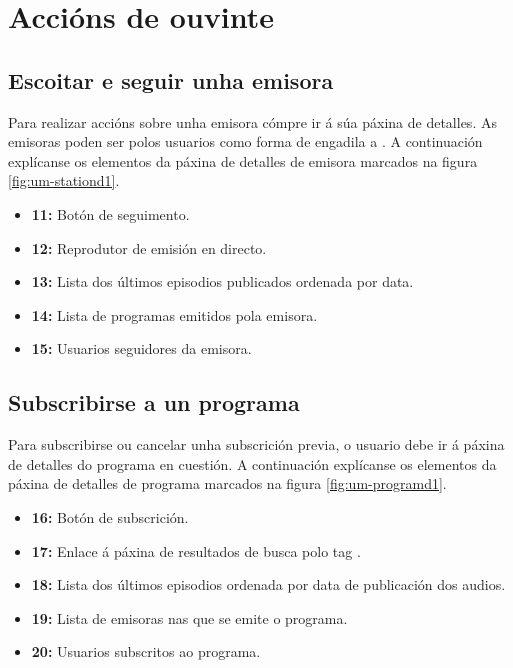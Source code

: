\section{Accións de ouvinte}

\subsection{Escoitar e seguir unha emisora}

Para realizar accións sobre unha emisora cómpre ir á súa páxina de detalles. As emisoras poden ser  polos usuarios como forma de engadila a . A continuación explícanse os elementos da páxina de detalles de emisora marcados na figura \ref{fig:um-stationd1}.

\begin{itemize}
	\item \textbf{11:} Botón de seguimento.
	\item \textbf{12:} Reprodutor de emisión en directo.
	\item \textbf{13:} Lista dos últimos episodios publicados ordenada por data.
	\item \textbf{14:} Lista de programas emitidos pola emisora.
	\item \textbf{15:} Usuarios seguidores  da emisora.
\end{itemize}


\subsection{Subscribirse a un programa}

Para subscribirse ou cancelar unha subscrición previa, o usuario debe ir á páxina de detalles do programa en cuestión. A continuación explícanse os elementos da páxina de detalles de programa marcados na figura \ref{fig:um-programd1}.

\begin{itemize}
	\item \textbf{16:} Botón de subscrición.
	\item \textbf{17:} Enlace á páxina de resultados de busca polo tag .
	\item \textbf{18:} Lista dos últimos episodios ordenada por data de publicación dos audios.
	\item \textbf{19:} Lista de emisoras nas que se emite o programa.
	\item \textbf{20:} Usuarios subscritos ao programa.
\end{itemize}

